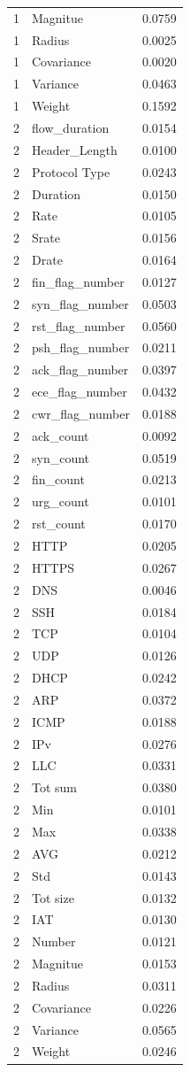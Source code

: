 \begin{tabular}{rlr}
1 & Magnitue & 0.0759 \\
1 & Radius & 0.0025 \\
1 & Covariance & 0.0020 \\
1 & Variance & 0.0463 \\
1 & Weight & 0.1592 \\
2 & flow\_duration & 0.0154 \\
2 & Header\_Length & 0.0100 \\
2 & Protocol Type & 0.0243 \\
2 & Duration & 0.0150 \\
2 & Rate & 0.0105 \\
2 & Srate & 0.0156 \\
2 & Drate & 0.0164 \\
2 & fin\_flag\_number & 0.0127 \\
2 & syn\_flag\_number & 0.0503 \\
2 & rst\_flag\_number & 0.0560 \\
2 & psh\_flag\_number & 0.0211 \\
2 & ack\_flag\_number & 0.0397 \\
2 & ece\_flag\_number & 0.0432 \\
2 & cwr\_flag\_number & 0.0188 \\
2 & ack\_count & 0.0092 \\
2 & syn\_count & 0.0519 \\
2 & fin\_count & 0.0213 \\
2 & urg\_count & 0.0101 \\
2 & rst\_count & 0.0170 \\
2 & HTTP & 0.0205 \\
2 & HTTPS & 0.0267 \\
2 & DNS & 0.0046 \\
2 & SSH & 0.0184 \\
2 & TCP & 0.0104 \\
2 & UDP & 0.0126 \\
2 & DHCP & 0.0242 \\
2 & ARP & 0.0372 \\
2 & ICMP & 0.0188 \\
2 & IPv & 0.0276 \\
2 & LLC & 0.0331 \\
2 & Tot sum & 0.0380 \\
2 & Min & 0.0101 \\
2 & Max & 0.0338 \\
2 & AVG & 0.0212 \\
2 & Std & 0.0143 \\
2 & Tot size & 0.0132 \\
2 & IAT & 0.0130 \\
2 & Number & 0.0121 \\
2 & Magnitue & 0.0153 \\
2 & Radius & 0.0311 \\
2 & Covariance & 0.0226 \\
2 & Variance & 0.0565 \\
2 & Weight & 0.0246 \\
\bottomrule
\end{tabular}
